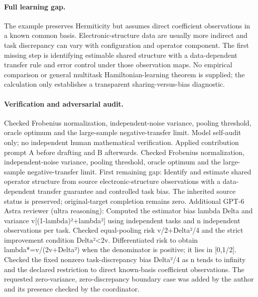 \documentclass[11pt]{article}
\begin{document}
\paragraph{Full learning gap.} The example preserves Hermiticity but assumes direct coefficient observations in a known common basis. Electronic-structure data are usually more indirect and task discrepancy can vary with configuration and operator component. The first missing step is identifying estimable shared structure with a data-dependent transfer rule and error control under those observation maps. No empirical comparison or general multitask Hamiltonian-learning theorem is supplied; the calculation only establishes a transparent sharing-versus-bias diagnostic.

\paragraph{Verification and adversarial audit.}
Checked Frobenius normalization, independent-noise variance, pooling threshold, oracle optimum and the large-sample negative-transfer limit. Model self-audit only; no independent human mathematical verification. Applied contribution prompt A before drafting and B afterwards. Checked Frobenius normalization, independent-noise variance, pooling threshold, oracle optimum and the large-sample negative-transfer limit. First remaining gap: Identify and estimate shared operator structure from source electronic-structure observations with a data-dependent transfer guarantee and controlled task bias. The inherited source status is preserved; original-target completion remains zero. Additional GPT-6 Astra reviewer (ultra reasoning): Computed the estimator bias lambda Delta and variance v[(1-lambda)²+lambda²] using independent tasks and n independent observations per task. Checked equal-pooling risk v/2+Delta²/4 and the strict improvement condition Delta²<2v. Differentiated risk to obtain lambda*=v/(2v+Delta²) when the denominator is positive; it lies in [0,1/2]. Checked the fixed nonzero task-discrepancy bias Delta²/4 as n tends to infinity and the declared restriction to direct known-basis coefficient observations. The requested zero-variance, zero-discrepancy boundary case was added by the author and its presence checked by the coordinator.
\end{document}
